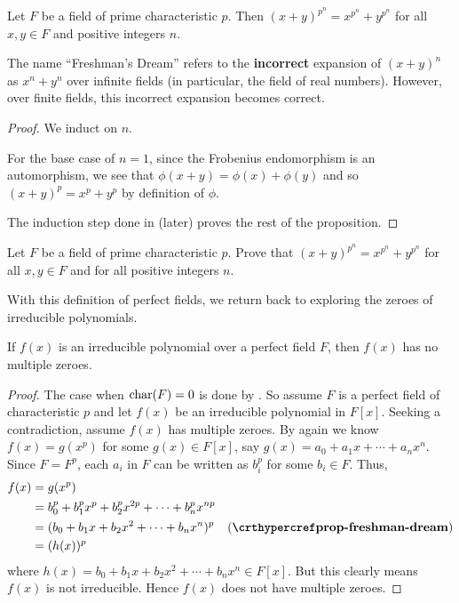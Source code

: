 \begin{proposition}\label{prop-freshman-dream}
    Let $F$ be a field of prime characteristic $p$. Then $(x + y)^{p^n} = x^{p^n} + y^{p^n}$ for all $x,y \in F$ and positive integers $n$.
\end{proposition}
\begin{remark}
    The name ``Freshman's Dream'' refers to the \textbf{incorrect} expansion of $(x+y)^n$ as $x^n + y^n$ over infinite fields (in particular, the field of real numbers). However, over finite fields, this incorrect expansion becomes correct.
\end{remark}
\begin{proof}
    We induct on $n$.

    For the base case of $n = 1$, since the Frobenius endomorphism is an automorphism, we see that $\phi(x+y) = \phi(x) + \phi(y)$ and so $(x+y)^p = x^p + y^p$ by definition of $\phi$.

    The induction step done in  (later) proves the rest of the proposition.
\end{proof}

\begin{exercise}\label{exercise-freshman-dream}
    Let $F$ be a field of prime characteristic $p$. Prove that $(x + y)^{p^n} = x^{p^n} + y^{p^n}$ for all $x,y \in F$ and for all positive integers $n$.
\end{exercise}

With this definition of perfect fields, we return back to exploring the zeroes of irreducible polynomials.

\begin{theorem}\label{thrm-irreducible-polynomial-over-perfect-field-has-no-multiple-zeroes}
    If $f(x)$ is an irreducible polynomial over a perfect field $F$, then $f(x)$ has no multiple zeroes.
\end{theorem}
\begin{proof}
    The case when $\mathrm{char}(F) = 0$ is done by . So assume $F$ is a perfect field of characteristic $p$ and let $f(x)$ be an irreducible polynomial in $F[x]$. Seeking a contradiction, assume $f(x)$ has multiple zeroes. By  again we know $f(x) = g(x^p)$ for some $g(x) \in F[x]$, say $g(x) = a_0 + a_1x + \cdots + a_nx^n$. Since $F = F^p$, each $a_i$ in $F$ can be written as $b_i^p$ for some $b_i \in F$. Thus,
    \begin{align*}
        f(x) &= g(x^p)\\
        &= b_0^p + b_1^px^p + b_2^px^{2p} + \cdots + b_n^px^{np}\\
        &= (b_0 + b_1x + b_2x^2 + \cdots + b_nx^n)^p & (\myref{prop-freshman-dream})\\
        &= (h(x))^p
    \end{align*}
    where $h(x) = b_0 + b_1x + b_2x^2 + \cdots + b_nx^n \in F[x]$. But this clearly means $f(x)$ is not irreducible. Hence $f(x)$ does not have multiple zeroes.
\end{proof}


